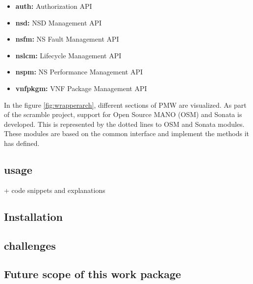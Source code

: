 \begin{itemize}
	\item \textbf{auth: }Authorization API
	\item \textbf{nsd: }NSD Management API
	\item \textbf{nsfm: }NS Fault Management API
	\item \textbf{nslcm: }Lifecycle Management API
	\item \textbf{nspm: }NS Performance Management API
	\item \textbf{vnfpkgm: }VNF Package Management API
\end{itemize} 

In the figure \ref{fig:wrapperarch}, different sections of PMW are visualized. As part of the scramble project, support for Open Source MANO (OSM) and Sonata is developed. This is represented by the dotted lines to OSM and Sonata modules. These modules are based on the common interface and implement the methods it has defined.

\subsection{usage}

+ code snippets and explanations


\subsection{Installation}
\subsection{challenges}
\subsection{Future scope of this work package}

